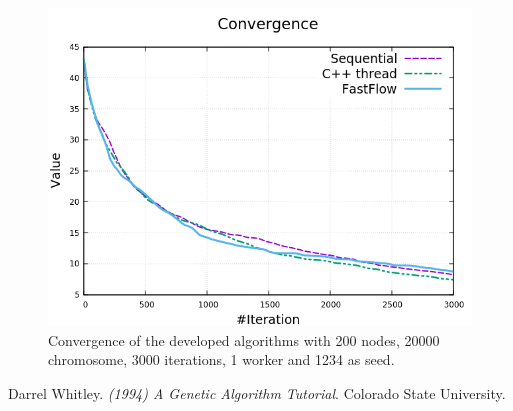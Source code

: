 \documentclass[a4paper,10pt]{article}
\begin{document}
	\begin{figure}[H]
	\centering
	\includegraphics[width=\linewidth]{img/convergence.png}
	\caption{Convergence of the developed algorithms with 200 nodes, 20000 chromosome, 3000 iterations, 1 worker and 1234 as seed.}
	\label{convergence}
\end{figure}


\begin{thebibliography}{9}
	
	Darrel Whitley.
	\textit{(1994) A Genetic Algorithm Tutorial}. Colorado State University.
	
		
\end{thebibliography}
\end{document}

